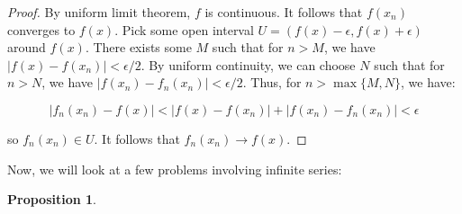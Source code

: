 \documentclass[10pt, oneside]{amsart}
\newtheorem{prop}{Proposition}
\begin{document}
    \begin{proof}
      By uniform limit theorem, $f$ is continuous. It follows that $f(x_n)$ converges to $f(x)$. Pick some open interval $U = (f(x) - \epsilon, f(x) + \epsilon)$ around $f(x)$. There exists some
      $M$ such that for $n > M$, we have $|f(x) - f(x_n)| < \epsilon/2$. By uniform continuity, we can choose $N$ such that for $n > N$, we have $|f(x_n) - f_n(x_n)| < \epsilon/2$. Thus, for $n > \max \{M, N\}$, we have:

      $$|f_n(x_n) - f(x)| < |f(x) - f(x_n)| + |f(x_n) - f_n(x_n)| < \epsilon$$

      so $f_n(x_n) \in U$. It follows that $f_n(x_n) \rightarrow f(x)$.
    \end{proof}

    Now, we will look at a few problems involving infinite series:

    \begin{prop}

      \end{prop}

    
\end{document}

